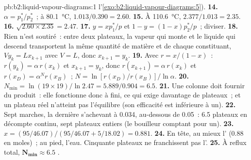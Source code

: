 \begin{solution}{pb:b2:liquid-vapour-diagrams:1}
l'\cref{exo:b2:liquid-vapour-diagrams:5}).
\textbf{14.} $\alpha = p_1^*/p_2^*$~; à \qty{80.1}{\degreeCelsius}, $1.013/0.390 =
2.60$.
\textbf{15.} À \qty{110.6}{\degreeCelsius}, $2.377/1.013 = 2.35$.
\textbf{16.} $\sqrt{2.60 \times 2.35} = 2.47$.
\textbf{17.} $y = xp_1^*/p$ et $1 - y = (1 - x)p_2^*/p$~; diviser.
\textbf{18.} Rien n'est soutiré~: entre deux plateaux, la vapeur qui monte et
le liquide qui descend transportent la même quantité de matière et de chaque constituant,
$V y_k = L x_{k+1}$ avec $V = L$, donc $x_{k+1} = y_k$.
\textbf{19.} Avec $r = x/(1 - x)$~: $r(y_k) = \alpha\,r(x_k)$ et $x_{k+1} = y_k$, donc
$r(x_{k+1}) = \alpha\,r(x_k)$ et $r(x_D) = \alpha^N r(x_B)$~; $N = \ln[r(x_D)/
r(x_B)]/\ln\alpha$.
\textbf{20.} $N_{\min} = \ln(19 \times 19)/\ln 2.47 = 5.889/0.904 = 6.5$.
\textbf{21.} Une colonne doit fournir du produit~: elle fonctionne donc à  fini,
ce qui exige davantage de plateaux~; et un plateau réel n'atteint pas l'équilibre (son
efficacité est inférieure à un).
\textbf{22.} Sept marches, la dernière s'achevant à 0.034, au-dessous de 0.05~: 6.5 plateaux en
décompte continu, sept plateaux entiers (le bouilleur comptant pour un).
\textbf{23.} $x = (95/46.07)/(95/46.07 + 5/18.02) = 0.881$.
\textbf{24.} En tête, au mieux l' (0.88 en moles)~; au pied,
l'eau. Cinquante plateaux ne franchissent pas l'.
\textbf{25.} À reflux total, $\boldsymbol{N_{\min} \approx 6.5}$ .
\end{solution}
